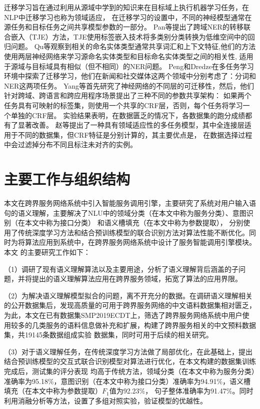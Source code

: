 迁移学习旨在通过利用从源域中学到的知识来在目标域上执行机器学习任务\cite{pan2009survey}，在NLP中迁移学习也称为领域适应，
在迁移学习的设置中，不同的神经模型通常在源任务和目标任务之间共享模型参数的一部分。
Pan等提出了跨域NER的转移联合嵌入（TJE）方法，TJE使用标签嵌入技术将多类别分类转换为低维空间中的回归问题\cite{pan2013transfer}。 
Qu等观察到相关的命名实体类型通常共享词汇和上下文特征\cite{qu2016named},他们的方法使用两层神经网络来学习源命名实体类型和目标命名实体类型之间的相关性,
适用于源域与目标域具有相似（但不相同）的NER问题。 
Peng和Dredze在多任务学习环境中探索了迁移学习\cite{peng2016multi}，他们在新闻和社交媒体这两个领域中分别考虑了：分词和NER这两项任务。
Yang等首先研究了神经网络的不同层的可迁移性\cite{yang2017transfer}，然后，他们针对跨域、跨语言和跨应用程序场景提出了三种不同的参数共享架构：
如果两个任务具有可映射的标签集，则使用一个共享的CRF层，否则，每个任务将学习一个单独的CRF层。
实验结果表明，在数据匮乏的情况下，各数据集的跑分成绩都有了显著改善。 
赵等提出了一种具有领域适应性的多任务模型，其中全连接层适用于不同的数据集，但CRF特征是分别计算的，其主要优点是，
在数据选择过程中会过滤掉分布不同且标注未对齐的实例\cite{zhao2018improve}。



\section{主要工作与组织结构}
本文在跨界服务网络系统中引入智能服务调用引擎，主要研究了系统对用户输入语句的语义理解，主要解决了NLU中的领域分类（在本文中称为服务分类）、意图识别（在本文中称为接口分类）
和语义槽填充（在本文中称为参数提取），
分别使用了传统深度学习方法和结合预训练模型的联合识别方法对算法性能不断优化。同时为将算法应用到系统中，在跨界服务网络系统中设计了服务智能调用引擎模块。本文
的主要研究工作如下：

（1）调研了现有语义理解算法以及主要用途，分析了语义理解背后涵盖的子问题，并将提出的语义理解算法应用在跨界服务领域，拓宽了算法的应用界限。

（2）为解决语义理解模型拟合的问题，离不开充分的数据。在调研语义理解相关的公开数据集后，发现高质量的可用于跨界服务网络的中文语料数据集相对匮乏，
为此，本文在已有数据集SMP2019ECDT上，筛选了跨界服务网络系统中用户使用较多的几类服务的语料信息做补充和扩展，构建了跨界服务相关的中文预料数据集，共19145条数据组成实验
数据集，同时可用于后续的相关研究。

（3）对于语义理解任务，在传统深度学习方法做了局部优化，在此基础上，提出结合预训练模型的交互式联合识别模型对算法进行优化，在本文构建的数据集训练完成后，测试集的评分表现
均高于传统方法，领域分类（在本文中称为服务分类）准确率为95.18\%，意图识别（在本文中称为接口分类）准确率为94.91\%，语义槽填充（在本文中称为参数提取）$F_1$值为92.23\%，
句子整体准确率为91.47\%。同时利用消融分析等方法，设置了多组对照实验，验证模型的优越性。

